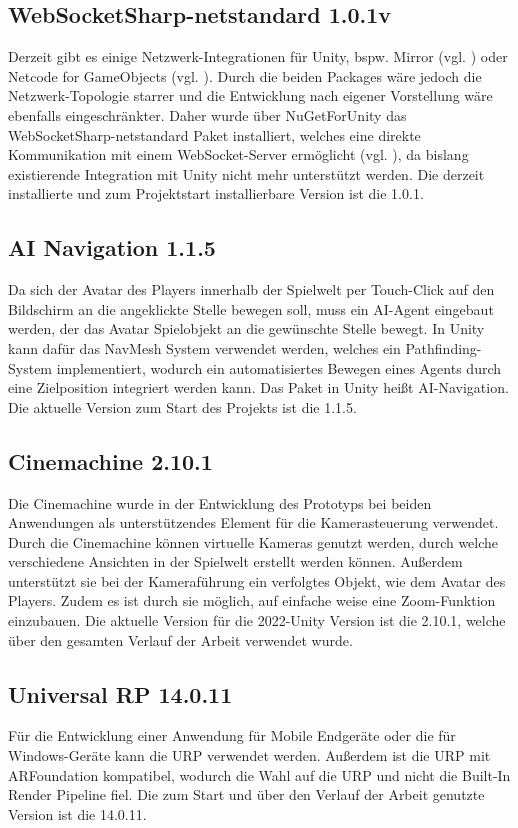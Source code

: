 \subsection{WebSocketSharp-netstandard 1.0.1v}
Derzeit gibt es einige Netzwerk-Integrationen für Unity, bspw. Mirror (vgl. \cite{noauthor_mirror_nodate}) oder Netcode for GameObjects (vgl. \cite{noauthor_about_2025}). Durch die beiden Packages wäre jedoch die Netzwerk-Topologie starrer und die Entwicklung nach eigener Vorstellung wäre ebenfalls eingeschränkter. Daher wurde über NuGetForUnity das WebSocketSharp-netstandard Paket installiert, welches eine direkte Kommunikation mit einem WebSocket-Server ermöglicht (vgl. \cite{pingman_tools_pingmantoolswebsocket-sharp_2025}), da bislang existierende Integration mit Unity nicht mehr unterstützt werden. Die derzeit installierte und zum Projektstart installierbare Version ist die 1.0.1.

\subsection{AI Navigation 1.1.5}
Da sich der Avatar des Players innerhalb der Spielwelt per Touch-Click auf den Bildschirm an die angeklickte Stelle bewegen soll, muss ein \ac{AI}-Agent eingebaut werden, der das Avatar Spielobjekt an die gewünschte Stelle bewegt. In Unity kann dafür das NavMesh System verwendet werden, welches ein Pathfinding-System implementiert, wodurch ein automatisiertes Bewegen eines Agents durch eine Zielposition integriert werden kann. Das Paket in Unity heißt \ac{AI}-Navigation. Die aktuelle Version zum Start des Projekts ist die 1.1.5.

\subsection{Cinemachine 2.10.1}
Die Cinemachine wurde in der Entwicklung des Prototyps bei beiden Anwendungen als unterstützendes Element für die Kamerasteuerung verwendet. Durch die Cinemachine können virtuelle Kameras genutzt werden, durch welche verschiedene Ansichten in der Spielwelt erstellt werden können. Außerdem unterstützt sie bei der Kameraführung ein verfolgtes Objekt, wie dem Avatar des Players. Zudem es ist durch sie möglich, auf einfache weise eine Zoom-Funktion einzubauen. Die aktuelle Version für die 2022-Unity Version ist die 2.10.1, welche über den gesamten Verlauf der Arbeit verwendet wurde.

\subsection{Universal RP 14.0.11}
Für die Entwicklung einer Anwendung für Mobile Endgeräte oder die für Windows-Geräte kann die \ac{URP} verwendet werden. Außerdem ist die \ac{URP} mit ARFoundation kompatibel, wodurch die Wahl auf die \ac{URP} und nicht die Built-In Render Pipeline fiel. Die zum Start und über den Verlauf der Arbeit genutzte Version ist die 14.0.11.

